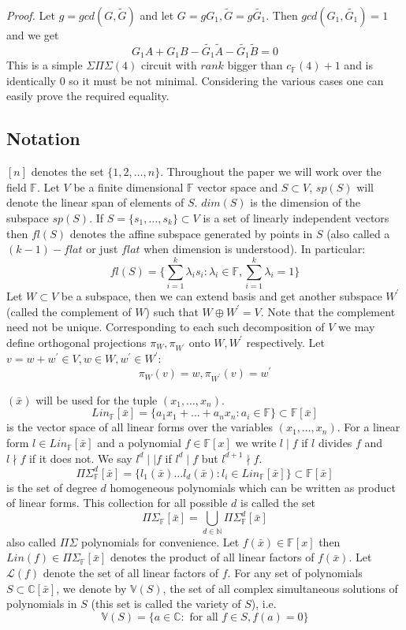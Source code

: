 \documentclass[letterpaper,USenglish,numberwithinsect]{lipics}
\newcommand{\N}{\mathbb{N}}
\newcommand{\F}{\mathbb{F}}
\newcommand{\C}{\mathbb{C}}
\newcommand{\ML}{\mathcal{L}}
\newcommand{\B}[1]{\bar{#1}}
\newcommand{\ti}[1]{\tilde{#1}}
\begin{document}
\emph{Proof.}
Let $g= gcd(G, \ti{G})$ and let $G=gG_1, \ti{G} = g\ti{G_1}$. Then
$gcd(G_1,\ti{G_1})=1$ and we get
\[
G_1 A + G_1 B - \ti{G_1}\ti{A} - \ti{G_1} \ti{B} = 0
\]
This is a simple $\Sigma\Pi\Sigma(4)$ circuit with $rank$ bigger than
$c_{\F}(4)+1$ and is identically $0$ so
it must be not minimal. Considering the various cases one can easily prove the required
equality.


\subsection{Notation}\label{notation}

$[n]$ denotes the set $\{1,2,\ldots,n\}$. Throughout the paper we will work over
the field $\F$.
Let $V$ be a finite dimensional $\F$ vector space and $S\subset V$, $sp(S)$ will
denote the linear span of elements of $S$. $dim(S)$ is the dimension of
the subspace $sp(S)$. If $S=\{s_1,\ldots ,s_k\}\subset V$ is a set of linearly independent vectors
then $fl(S)$ denotes the affine subspace generated by points in $S$ (also called
a $(k-1)-flat$ or just $flat$ when dimension is understood). In particular:
\[
fl(S) = \{\sum\limits_{i=1}^k \lambda_i s_i : \lambda_i\in \F,
\sum\limits_{i=1}^k \lambda_i=1\}
\]
 Let $W\subset V$ be a subspace, then we can extend basis and get another
subspace
$W^\prime$ (called the complement of $W$) such that $W\oplus W^\prime = V$. Note
that the complement need not be unique.
Corresponding to each such decomposition of $V$ we may define orthogonal
projections $\pi_W,\pi_{W^\prime}$ onto $W,W^\prime$ respectively. Let
$v=w+w^\prime \in V, w\in W,w^\prime \in W^\prime$:
\[
\pi_{W}(v) = w, \pi_{W^\prime}(v)=w^\prime
\]

$(\B{x})$ will be used for the tuple $(x_1,\ldots,x_n)$.
\[
Lin_\F[\B{x}] = \{a_1x_1+\ldots + a_nx_n : a_i\in \F\}
\subset \F[\B{x}]
 \]
 is the vector space of all linear forms over the variables $(x_1,\ldots,x_n)$. For a linear form $l\in Lin_\F[\B{x}]$ and a polynomial $f\in \F[x]$
we write $l\mid f$ if $l$ divides $f$ and $l\nmid f$ if it does not. We say $l^d \mid\mid f$ if $l^d\mid f$ but $l^{d+1} \nmid f$.
 \[
 \Pi\Sigma^d_\F[\B{x}] = \{l_1(\B{x})\ldots l_d(\B{x}): l_i\in Lin_\F[\B{x}]\}\subset \F[\B{x}]
 \]
is the set of degree $d$ homogeneous polynomials which can be written as product of linear forms. This collection for all possible $d$ is called
the set
\[
 \Pi\Sigma_\F[\B{x}] = \bigcup\limits_{d\in \N}\Pi\Sigma^d_\F[\B{x}]
\]
also called $\Pi\Sigma$ polynomials for convenience.
Let $f(\B{x})\in\F[x]$ then
$Lin(f)\in \Pi\Sigma_\F[\B{x}]$ denotes the product of all linear factors of
$f(\B{x})$. Let $\ML(f)$ denote the set of all linear factors of $f$. For any set of polynomials $S\subset \C[\B{x}]$, we denote by $\mathbb{V}(S)$,
the set of all complex simultaneous solutions of polynomials in $S$ (this set is called the variety of $S$), i.e.
\[
 \mathbb{V}(S) =\{a\in \C : \text{ for all } f\in S, f(a)=0 \}
\]
\end{document}
